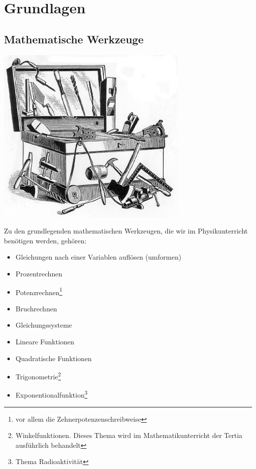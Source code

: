 \chapter{Grundlagen}
\section{Mathematische Werkzeuge}
\begin{marginfigure}
	\includegraphics[width=0.7\textwidth]{Bilder/toolbox.jpg}
	\label{fig:toolboxfig}
\end{marginfigure} 
Zu den grundlegenden mathematischen Werkzeugen, die wir im Physikunterricht benötigen werden, gehören:
\begin{itemize}
	\item Gleichungen nach einer Variablen auflösen (umformen)
	\item Prozentrechnen
	\item Potenzrechnen\footnote{vor allem die Zehnerpotenzenschreibweise}
	\item Bruchrechnen
	\item Gleichungssysteme
    \item Lineare Funktionen
    \item Quadratische Funktionen
	\item Trigonometrie\footnote{Winkelfunktionen. Dieses Thema wird im Mathematikunterricht der Tertia ausführlich behandelt}
	\item Exponentionalfunktion\footnote{Thema Radioaktivität}
\end{itemize}


